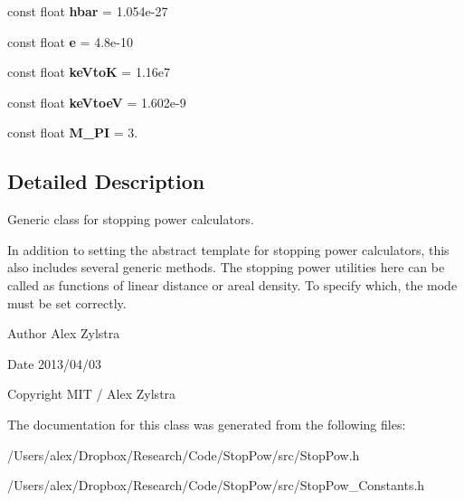 \begin{DoxyCompactItemize}
\item 
\hypertarget{class_stop_pow_a490a4426ad065fc87b8073916a2bfde5}{const float {\bfseries hbar} = 1.\-054e-\/27}\label{class_stop_pow_a490a4426ad065fc87b8073916a2bfde5}

\item 
\hypertarget{class_stop_pow_afc6ea6653f4019089c4f9f5bd533c6dd}{const float {\bfseries e} = 4.\-8e-\/10}\label{class_stop_pow_afc6ea6653f4019089c4f9f5bd533c6dd}

\item 
\hypertarget{class_stop_pow_a7f5bc92566875fc37f39ac91e0c9cf29}{const float {\bfseries ke\-Vto\-K} = 1.\-16e7}\label{class_stop_pow_a7f5bc92566875fc37f39ac91e0c9cf29}

\item 
\hypertarget{class_stop_pow_aca0237f7033276a418eed333c93e4e6f}{const float {\bfseries ke\-Vtoe\-V} = 1.\-602e-\/9}\label{class_stop_pow_aca0237f7033276a418eed333c93e4e6f}

\item 
\hypertarget{class_stop_pow_aaa6917e7a9cef2457c749d7ebac17f45}{const float {\bfseries M\-\_\-\-P\-I} = 3.}\label{class_stop_pow_aaa6917e7a9cef2457c749d7ebac17f45}

\end{DoxyCompactItemize}


\subsection{Detailed Description}
Generic class for stopping power calculators. 

In addition to setting the abstract template for stopping power calculators, this also includes several generic methods. The stopping power utilities here can be called as functions of linear distance or areal density. To specify which, the mode must be set correctly.

\begin{DoxyAuthor}{Author}
Alex Zylstra 
\end{DoxyAuthor}
\begin{DoxyDate}{Date}
2013/04/03 
\end{DoxyDate}
\begin{DoxyCopyright}{Copyright}
M\-I\-T / Alex Zylstra 
\end{DoxyCopyright}


The documentation for this class was generated from the following files\-:\begin{DoxyCompactItemize}
\item 
/\-Users/alex/\-Dropbox/\-Research/\-Code/\-Stop\-Pow/src/Stop\-Pow.\-h\item 
/\-Users/alex/\-Dropbox/\-Research/\-Code/\-Stop\-Pow/src/Stop\-Pow\-\_\-\-Constants.\-h\end{DoxyCompactItemize}
